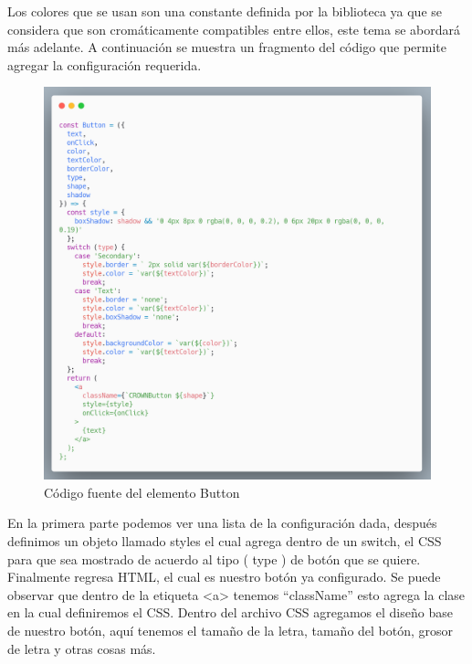 \newline
Los colores que se usan son una constante definida por la biblioteca ya que se considera que son cromáticamente compatibles entre ellos, este tema se abordará más adelante.
A continuación se muestra un fragmento del código que permite agregar la configuración requerida.
\newline
\newline
\begin{figure}[H]
    \includegraphics[width=1\textwidth]{./Imagenes/carbon-9.png}
    \caption[Código fuente del elemento Button]{Código fuente del elemento Button}
    \end{figure}
\newline
\newline
En la primera parte podemos ver una lista de la configuración dada,  después definimos un objeto llamado styles el cual agrega dentro de un switch, el CSS para que sea mostrado de acuerdo al tipo ( type ) de botón que se quiere. Finalmente regresa HTML, el cual es nuestro botón ya configurado.
Se puede observar que dentro de la etiqueta <a>  tenemos “className” esto agrega la clase en la cual definiremos el CSS.
Dentro del archivo CSS agregamos el diseño base de nuestro botón, aquí tenemos el  tamaño de la letra, tamaño del botón, grosor de letra y otras cosas más.
\newline
